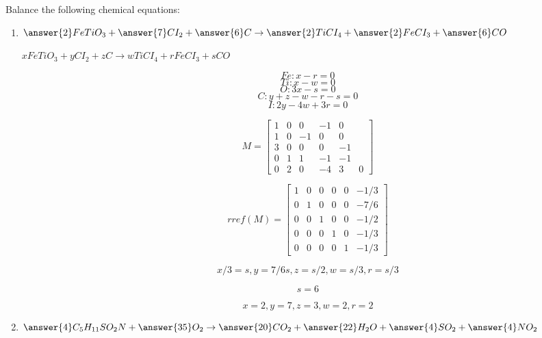 \documentclass{ximera}
\author{Zack Reed}
\begin{document}
\begin{problem}

Balance the following chemical equations:

\begin{enumerate}

    \item $\answer{2}FeTiO_3+\answer{7}CI_2+\answer{6}C\rightarrow \answer{2}TiCI_4+\answer{2}FeCI_3+\answer{6}CO$
    
    $xFeTiO_3+yCI_2+zC\rightarrow wTiCI_4+rFeCI_3+sCO$

    $$Fe: x-r=0$$
    $$Ti: x-w=0$$
    $$O: 3x-s=0$$
    $$C: y+z-w-r-s=0$$
    $$I: 2y-4w+3r=0$$

    $$M=\begin{bmatrix} 1 & 0 & 0 & -1 & 0 \\ 1 & 0 & -1 & 0 & 0 \\ 3 & 0 & 0 & 0 & -1 \\ 0 & 1 & 1 & -1 & -1 \\ 0 & 2 & 0 & -4 & 3 & 0 \end{bmatrix}$$

    $$rref(M)=\begin{bmatrix} 1 & 0 & 0 & 0 & 0 &  -1/3 \\ 
        0 & 1 & 0 & 0 & 0 &-7/6 \\ 
        0 & 0 & 1 & 0 & 0 & -1/2 \\ 
        0 & 0 & 0 & 1 & 0 & -1/3 \\ 
        0 & 0 & 0 & 0 & 1 & -1/3\end{bmatrix}$$

    $$x/3=s, y=7/6s, z=s/2, w=s/3, r=s/3$$

    $$s=6$$

    $$x=2, y=7, z=3, w=2, r=2$$
    
    \item $\answer{4}C_5H_{11}SO_2N+\answer{35}O_2\rightarrow \answer{20}CO_2+\answer{22}H_2O+\answer{4}SO_2+\answer{4}NO_2$

\end{enumerate}

\end{problem}
\end{document}
